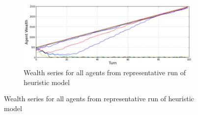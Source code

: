 \documentclass{article}
\begin{document}
\begin{figure}[h!]
	\centering
	\begin{subfigure}{\textwidth}
		\includegraphics[width=\textwidth]{Graphics/Exp1SampleRun}
		\caption{Wealth series for all agents from representative run of heuristic model}
	\end{subfigure}


\end{figure}
\end{document}
